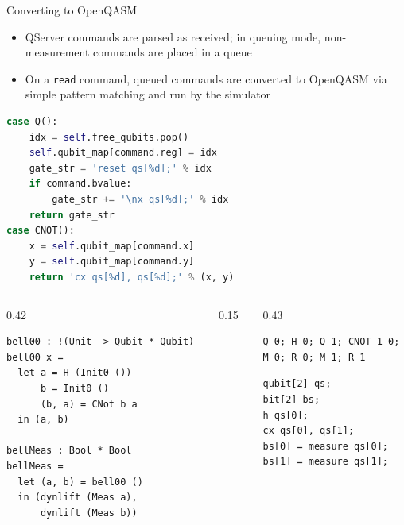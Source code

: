 \documentclass{beamer}
\begin{document}
\begin{frame}[fragile]{Converting to OpenQASM}
  \begin{itemize}
    \item QServer commands are parsed as received; in queuing mode, non-measurement commands are placed in a queue
    \item On a \texttt{read} command, queued commands are converted to OpenQASM via simple pattern matching and run by the simulator
  \end{itemize}
  \begin{center}
  \begin{minipage}{0.7\textwidth}
  \begin{lstlisting}[language=Python, morekeywords={case,match}, basicstyle=\ttfamily\scriptsize]
case Q():
    idx = self.free_qubits.pop()
    self.qubit_map[command.reg] = idx
    gate_str = 'reset qs[%d];' % idx
    if command.bvalue:
        gate_str += '\nx qs[%d];' % idx
    return gate_str
case CNOT():
    x = self.qubit_map[command.x]
    y = self.qubit_map[command.y]
    return 'cx qs[%d], qs[%d];' % (x, y)
  \end{lstlisting}
  \end{minipage}
  \end{center}
\end{frame}

\begin{frame}
  \begin{columns}[t]
    \begin{column}{0.42\textwidth}
      \begin{lstlisting}[language=ProtoQuipper]
bell00 : !(Unit -> Qubit * Qubit)
bell00 x =
  let a = H (Init0 ())
      b = Init0 ()
      (b, a) = CNot b a
  in (a, b)

bellMeas : Bool * Bool
bellMeas =
  let (a, b) = bell00 ()
  in (dynlift (Meas a),
      dynlift (Meas b))
      \end{lstlisting}
    \end{column}
    \begin{column}{0.15\textwidth}
      \vspace{3em}
      \centering{$\Longrightarrow$}
    \end{column}
    \begin{column}{0.43\textwidth}
      \begin{lstlisting}[language=QServer]
Q 0; H 0; Q 1; CNOT 1 0;
M 0; R 0; M 1; R 1
      \end{lstlisting}
      \vspace{0.5em}
      \centering{$\Longrightarrow$}
      \vspace{0.5em}
      \begin{lstlisting}[language=OpenQASM]
qubit[2] qs;
bit[2] bs;
h qs[0];
cx qs[0], qs[1];
bs[0] = measure qs[0];
bs[1] = measure qs[1];
      \end{lstlisting}
    \end{column}
  \end{columns}
\end{frame}
\end{document}
